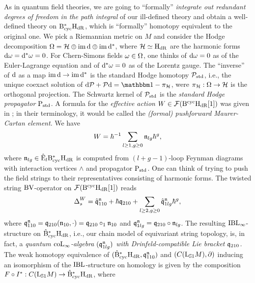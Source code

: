 \documentclass[\MainFolder/Text.tex]{subfiles}
\begin{document}

As in quantum field theories, we are going to ``formally'' \emph{integrate out redundant degrees of freedom in the path integral} of our ill-defined theory and obtain a well-defined theory on $\mathrm{B}_{\mathrm{cyc}}^*\mathrm{H}_{\mathrm{dR}}$, which is ``formally'' homotopy equivalent to the original one. We pick a Riemannian metric on $M$ and consider the Hodge decomposition $\Omega = \mathcal{H} \oplus \operatorname{im}\mathrm{d} \oplus \operatorname{im}\mathrm{d}^*$, where $\mathcal{H} \simeq \mathrm{H}_{\mathrm{dR}}$ are the harmonic forms $\mathrm{d} \omega = \mathrm{d}^* \omega = 0$. For Chern-Simons fields $\omega\in \Omega$, one thinks of $\mathrm{d} \omega = 0$ as of the Euler-Lagrange equation and of $\mathrm{d}^* \omega = 0$ as of the Lorentz gauge. The ``inverse'' of $\mathrm{d}$ as a map $\operatorname{im}\mathrm{d} \rightarrow \operatorname{im} \mathrm{d}^*$ is the standard Hodge homotopy $\mathcal{P}_{\mathrm{std}}$, i.e., the unique coexact solution of $\Dd \Htp + \Htp \Dd = \Id - \pi_\Harm$, were $\pi_{\mathcal{H}}: \Omega \rightarrow \mathcal{H}$ is the orthogonal projection. The Schwartz kernel of $\mathcal{P}_{\mathrm{std}}$ is the \emph{standard Hodge propagator} $\mathrm{P}_{\mathrm{std}}$. A formula for the \emph{effective action} $W\in\mathcal{F}(\mathrm{B}^{\mathrm{cyc}}\mathrm{H}_{\mathrm{dR}}[1])$ was given in \cite{Cieliebak2015}; in their terminology, it would be called the \emph{(formal) pushforward Maurer-Cartan element}. We have
$$ W = \hbar^{-1}\sum_{l\ge 1, g\ge 0} \mathfrak{n}_{lg} \hbar^{g}, $$
where $\mathfrak{n}_{lg} \in \hat{\mathrm{E}}_l \mathrm{B}_{\mathrm{cyc}}^*\mathrm{H}_{\mathrm{dR}}$ is computed from $(l+g-1)$-loop Feynman diagrams with interaction vertices $\wedge$ and propagator $\mathrm{P}_{\mathrm{std}}$. One can think of trying to push the field strings to their representatives consisting of harmonic forms. The twisted string $\mathrm{BV}$-operator on $\mathcal{F}(\mathrm{B}^{\mathrm{cyc}}\mathrm{H}_{\mathrm{dR}}[1])$ reads
$$ \operatorname{\Delta}^W_s = \hat{\mathfrak{q}}^{\mathfrak{n}}_{110}  +  \hbar{\mathfrak{q}}_{210} + \sum_{l\ge 2, g\ge 0} \hat{\mathfrak{q}}^{\mathfrak{n}}_{1lg} \hbar^{g}, $$
where $\mathfrak{q}_{110}^{\mathfrak{n}} = \mathfrak{q}_{210}(\mathfrak{n}_{10},\cdot) = \mathfrak{q}_{210}\circ_1 \mathfrak{n}_{10}$ and $\mathfrak{q}_{1lg}^{\mathfrak{n}} = \mathfrak{q}_{210}\circ \mathfrak{n}_{lg}$. The resulting $\mathrm{IBL}_\infty$-structure on $\hat{\mathrm{B}}_{\mathrm{cyc}}^*\mathrm{H}_{\mathrm{dR}}$, i.e., our chain model of equivariant string topology, is, in fact, a \emph{quantum $\mathrm{coL}_\infty$-algebra $(\mathfrak{q}_{1lg}^{\mathfrak{n}})$ with Drinfeld-compatible Lie bracket $\mathfrak{q}_{210}$.} The weak homotopy equivalence of $(\hat{\mathrm{B}}_{\mathrm{cyc}}^*\mathrm{H}_{\mathrm{dR}},\mathfrak{q}_{110}^{\mathfrak{n}})$ and $(C(\mathrm{L}_{\mathbb{S}{1}} M),\partial)$ inducing an isomorphism of the $\mathrm{IBL}$-structure on homology is given by the composition $F\circ I^*: C(\mathrm{L}_{\mathbb{S}{1}} M) \rightarrow \hat{\mathrm{B}}_{\mathrm{cyc}}^* \mathrm{H}_{\mathrm{dR}}$, where 
\end{document}
